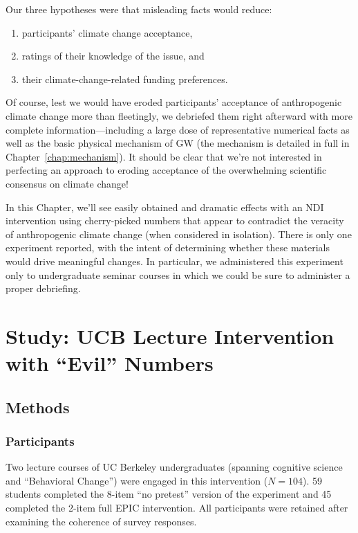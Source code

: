 Our three hypotheses were that misleading facts would reduce:
\begin{enumerate}
    \item participants’ climate change acceptance, 
    \item ratings of their knowledge of the issue, and 
    \item their climate-change-related funding preferences.
\end{enumerate}
Of course, lest we would have eroded participants’ acceptance of anthropogenic
climate change more than fleetingly, we debriefed them right afterward with more
complete information---including a large dose of representative numerical facts
as well as the basic physical mechanism of GW (the mechanism is detailed in full
in Chapter~\ref{chap:mechanism}). It should be clear that we're not interested
in perfecting an approach to eroding acceptance of the overwhelming scientific
consensus on climate change! 

In this Chapter, we'll see easily obtained and dramatic effects with an NDI
intervention using cherry-picked numbers that appear to contradict the veracity
of anthropogenic climate change (when considered in isolation). There is only
one experiment reported, with the intent of determining whether these materials
would drive meaningful changes. In particular, we administered this experiment
only to undergraduate seminar courses in which we could be sure to administer a
proper debriefing.

\section{Study: UCB Lecture Intervention with \texorpdfstring{“Evil”}{"Evil"}
    Numbers}

\subsection{Methods} 
\label{sec:evilndi-methods}

\subsubsection{Participants}
\label{sec:evil-participants}

Two lecture courses of UC Berkeley undergraduates (spanning cognitive science and
“Behavioral Change”) were engaged in this intervention ($N=104$). 59 students
completed the 8-item “no pretest” version of the experiment and 45 completed
the 2-item full EPIC intervention. All participants were retained after
examining the coherence of survey responses.


